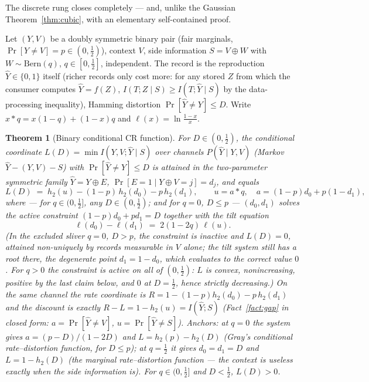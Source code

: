 \documentclass[11pt]{article}
\newtheorem{theorem}{Theorem}\newtheorem{corollary}{Corollary}
\begin{document}
The discrete rung closes completely --- and, unlike the Gaussian
Theorem~\ref{thm:cubic}, with an elementary self-contained proof.

Let $(Y,V)$ be a doubly symmetric binary pair (fair marginals,
$\Pr[Y\ne V]=p\in(0,\tfrac12)$), context $V$, side information
$S=V\oplus W$ with $W\sim\mathrm{Bern}(q)$, $q\in[0,\tfrac12]$,
independent. The record is the reproduction $\hat Y\in\{0,1\}$ itself
(richer records only cost more: for any stored $Z$ from which the
consumer computes $\hat Y=f(Z)$, $I(T;Z\mid S)\ge I(T;\hat Y\mid S)$ by
the data-processing inequality), Hamming distortion
$\Pr[\hat Y\ne Y]\le D$. Write $x*q=x(1-q)+(1-x)q$ and
$\ell(x)=\ln\frac{1-x}{x}$.

\begin{theorem}[Binary conditional CR function]\label{thm:binary}
For $D\in(0,\tfrac12)$, the conditional coordinate
$L(D)=\min I(Y,V;\hat Y\mid S)$ over channels $P(\hat Y\mid Y,V)$
(Markov $\hat Y-(Y,V)-S$) with $\Pr[\hat Y\ne Y]\le D$ is attained in
the two-parameter symmetric family $\hat Y=Y\oplus E$,
$\Pr[E=1\mid Y\oplus V=j]=d_j$, and equals
\[
L(D)\;=\;h_2(u)-(1-p)\,h_2(d_0)-p\,h_2(d_1),\qquad
u=a*q,\quad a=(1-p)d_0+p(1-d_1),
\]
where --- for $q\in(0,\tfrac12]$, any $D\in(0,\tfrac12)$; and for $q=0$,
$D\le p$ --- $(d_0,d_1)$ solves the active constraint $(1-p)d_0+pd_1=D$
together with the \emph{tilt equation}
\[
\ell(d_0)-\ell(d_1)\;=\;2(1-2q)\,\ell(u).
\]
(In the excluded sliver $q=0$, $D>p$, the constraint is inactive and
$L(D)=0$, attained non-uniquely by records measurable in $V$ alone; the
tilt system still has a root there, the degenerate point $d_1=1-d_0$,
which evaluates to the correct value $0$. For $q>0$ the constraint is
active on all of $(0,\tfrac12)$: $L$ is convex, nonincreasing, positive
by the last claim below, and $0$ at $D=\tfrac12$, hence strictly
decreasing.)
On the same channel the rate coordinate is $R=1-(1-p)h_2(d_0)-p\,h_2(d_1)$
and the discount is exactly $R-L=1-h_2(u)=I(\hat Y;S)$ (Fact~\ref{fact:gap}
in closed form: $a=\Pr[\hat Y\ne V]$, $u=\Pr[\hat Y\ne S]$). Anchors:
at $q=0$ the system gives $a=(p-D)/(1-2D)$ and
$L=h_2(p)-h_2(D)$ (Gray's conditional rate--distortion function, for
$D\le p$); at $q=\tfrac12$ it gives $d_0=d_1=D$ and $L=1-h_2(D)$ (the
marginal rate--distortion function --- the context is useless exactly
when the side information is). For $q\in(0,\tfrac12]$ and $D<\tfrac12$,
$L(D)>0$.
\end{theorem}
\end{document}
